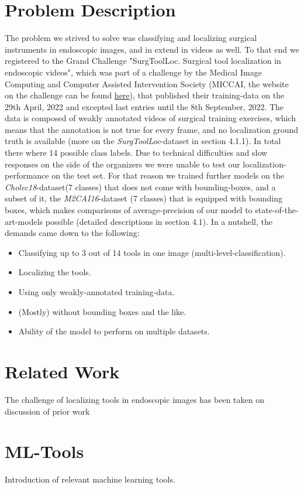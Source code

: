 \section{Problem Description}
The problem we strived to solve was classifying and localizing surgical instruments in endoscopic images, and in extend in videos as well. 
To that end we registered to the Grand Challenge "SurgToolLoc. Surgical tool localization in endoscopic videos", which was part of a challenge by the Medical Image Computing and Computer Assisted Intervention Society (MICCAI, the website on the challenge can be found \href{https://surgtoolloc.grand-challenge.org}{here}), that published their training-data on the 29th April, 2022 and excepted last entries until the 8th September, 2022. The data is composed of weakly annotated videos of surgical training exercises, which means that the annotation is not true for every frame, and no localization ground truth is available (more on the \textit{SurgToolLoc}-dataset in section 4.1.1). In total there where 14 possible class labels. Due to technical difficulties and slow responses on the side of the organizers we were unable to test our localization-performance on the test set. For that reason we trained further models on the \textit{Cholec18}-dataset(7 classes) that does not come with bounding-boxes, and a subset of it, the \textit{M2CAI16}-dataset (7 classes) that is equipped with bounding boxes, which makes comparisons of average-precision of our model to state-of-the-art-models possible (detailed descriptions in section 4.1).
In a nutshell, the demands came down to the following:
\begin{itemize}
	\item Classifying up to 3 out of 14 tools in one image (multi-level-classification).
	\item Localizing the tools.
	\item Using only weakly-annotated training-data.
	\item (Mostly) without bounding boxes and the like.
	\item Ability of the model to perform on multiple datasets.
\end{itemize}

\section{Related Work}
The challenge of localizing tools in endoscopic images has been taken on discussion of prior work

\section{ML-Tools}
Introduction of relevant machine learning tools.

